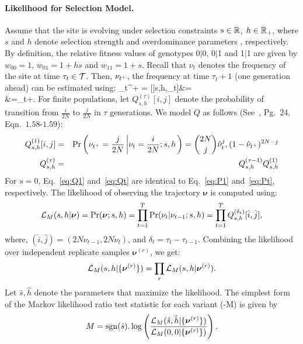 \paragraph{Likelihood for Selection Model.}
Assume that the site is evolving under selection constraints $s\in
{\mathbb R}$, $h\in {\mathbb R}_+$, where $s$ and $h$ denote selection strength and 
overdominance parameters ,
respectively. By definition, the relative fitness values of genotypes
0$|$0, 0$|$1 and 1$|$1 are given by $w_{00}=1$, $w_{01}=1+hs$ and
$w_{11}=1+s$. Recall that $\nu_t$ denotes the frequency of the site at
time $\tau_t\in {\cal T}$. Then, $\nu_{t^+}$, the frequency at time
$\tau_{t}+1$ (one generation ahead) can be estimated using: \beq 
\hat{\nu}_{t^+} =
[\nusp|s,h,\nu_t]&=\\
&=\nu_t+.
  \label{eq:transition}
\eeq
For finite populations, let $Q^{(\tau)}_{s,h}[i,j]$ denote the
probability of transition from $\frac{i}{2N}$ to $\frac{j}{2N}$ in
$\tau$ generations. We model $Q$ as follows
(See~\cite{Ewens2012Mathematical}, Pg.~24, Eqn.~$1.58$-$1.59$):
\begin{eqnarray}
  Q^{(1)}_{s,h}[i,j] &=& \operatorname{Pr}\left(\nu_{t^+}=\frac{j}{2N} \left\lvert
      \nu_{t}=\frac{i}{2N};s,h \right .\right)={2N \choose j}
  \hat{\nu}_{t^+}^{j} (1-\hat{\nu}_{t^+})^{2N-j}\label{eq:Q1}\\
  Q^{(\tau)}_{s,h} &=& Q^{(\tau-1)}_{s,h}Q^{(1)}_{s,h}\label{eq:Qt}
  \label{eq:mkvs}   
\end{eqnarray}
For $s=0$, Eq.~\ref{eq:Q1} and~\ref{eq:Qt} are identical to
Eq.~\ref{eq:P1} and~\ref{eq:Pt}, respectively.  The likelihood of
observing the trajectory $\bm{\nu}$ is computed using:
\begin{equation}
  {\cal L}_M(s,h|\bm{\nu}) = \operatorname{Pr}(\bm{\nu};s,h)=
  \prod_{t=1}^{T} \operatorname{Pr}(\nu_{t}|\nu_{t-1};s,h) = \prod_{t=1}^{T} 
  Q^{(\delta_t)}_{s,h}[\hat{i},\hat{j}],
\end{equation}
where, $(\hat{i},\hat{j})=( 2N\nu_{t-1},
2N\nu_{t})$, and 
$\delta_t=\tau_{t}-\tau_{t-1}$. 
Combining the
likelihood over independent replicate samples $\bm{\nu}^{(r)}$, we
get:
\begin{equation}
  {\cal L}_M(s,h|\{\bm{\nu}^{(r)}\}) = \prod_r   {\cal L}_M(s,h|\bm{\nu}^{(r)}).
  \label{eq:mkvlik}
\end{equation}
Let $\hat{s},\hat{h}$ denote the parameters that maximize the
likelihood. The simplest form of the Markov likelihood ratio test statistic  
for each variant (\comale-M) is given by
\begin{eqnarray}
M=\operatorname{sgn} (\hat{s}). \log 
\left(\frac{{\cal L}_M(\hat{s},\hat{h}|\{\bm{\nu}^{(r)}\})}{{\cal L}_M(0,0|\{\bm{\nu}^{(r)}\})}\right).
\label{eq:mcts}
\end{eqnarray}




